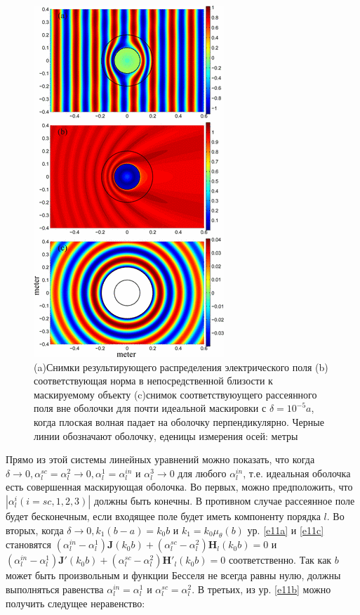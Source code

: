\documentclass[a4paper, 12pt]{article}
\begin{document}
\begin{figure}[t]
  \centering
  \includegraphics[height=0.3\paperheight, width=0.22\paperwidth]{2.png}
  \caption{(a)Снимки результирующего распределения электрического поля (b) соответствующая норма в непосредственной 
  близости к маскируемому объекту (c)снимок соответствуюущего рассеянного поля вне оболочки для почти идеальной маскировки
  с $\delta = 10^{-5}a$, когда плоская волная падает на оболочку перпендикулярно. Черные линии обозначают оболочку, еденицы
  измерения осей: метры}
  \label{fig:2}
\end{figure}

Прямо из этой системы линейных уравнений можно показать, что когда $\delta \to 0, \alpha_l^{sc}=\alpha_l^{2} \to 0, 
\alpha_l^1=\alpha_l^{in}$ и $\alpha_l^3 \to 0$ для любого $\alpha_l^{in}$, т.е. идеальная оболочка есть совершенная 
маскирующая оболочка. Во первых, можно предположить, что $\left| \alpha_l^i(i=sc,1,2,3) \right|$ должны быть конечны.
В противном случае рассеянное поле будет бесконечным, если входящее поле будет иметь компоненту порядка $l$. Во вторых,
когда $\delta \to 0, k_1(b-a)=k_0 b$ и $k_1=k_0 \mu_\theta(b)$ ур. \eqref{e11a} и \eqref{e11c} становятся 
$(\alpha_l^{in}-\alpha_l^1)\mathbf{J}(k_0 b) + (\alpha_l^{sc}-\alpha_l^2)\mathbf{H}_l(k_0 b) = 0$ и 
$(\alpha_l^{in}-\alpha_l^1)\mathbf{J'}(k_0 b) + (\alpha_l^{sc}-\alpha_l^2)\mathbf{H'}_l(k_0 b) = 0$ соответственно.
Так как $b$ может быть произвольным и функции Бесселя не всегда равны нулю, должны выполняться равенства $\alpha_l^{in}=\alpha_l^1$ и
$\alpha_l^{sc}=\alpha_l^2$. В третьих, из ур. \eqref{e11b} можно получить следущее неравенство:
\end{document}
